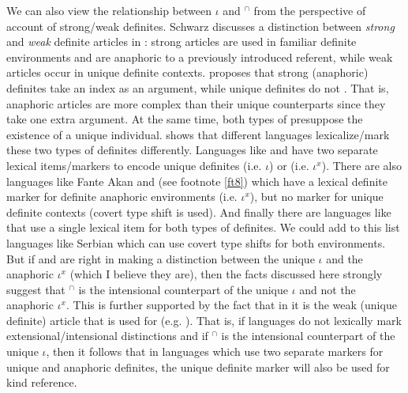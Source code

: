 \documentclass[output=paper,
modfonts
]{langscibook}
\begin{document}
	
	We can also view the relationship between $\iota$ and $^\cap$ from the perspective of  account of strong/weak definites. Schwarz discusses a distinction between \textit{strong} and \textit{weak} definite articles in : strong articles are used in familiar definite environments and are anaphoric to a previously introduced referent, while weak articles occur in unique definite contexts. \citeauthor{Schwarz2009} proposes that strong (anaphoric) definites take an index as an argument, while unique definites do not \citep[see also][]{Jenkstoappear}. That is, anaphoric articles are more complex than their unique counterparts since they take one extra argument. At the same time, both types of  presuppose the existence of a unique individual. \citet{Jenkstoappear} shows that different languages lexicalize/mark these two types of definites differently. Languages like  and  \citep[see][]{Schwarz2013} have two separate lexical items/markers to encode unique definites (i.e. $\iota$) or  (i.e. $\iota^x$). There are also languages like Fante Akan and  (see footnote \ref{ft8}) which have a lexical definite marker for definite anaphoric environments (i.e. $\iota^x$), but no marker for unique definite contexts (covert type shift is used). And finally there are languages like  that use a single lexical item for both types of definites. We could add to this list languages like Serbian which can use covert type shifts for both environments. But if \citeauthor{Schwarz2009} and \citeauthor{Jenkstoappear} are right in making a distinction between the unique $\iota$ and the anaphoric $\iota^x$ (which I believe they are), then the facts discussed here strongly suggest that $^\cap$ is the intensional counterpart of the unique $\iota$ and not the anaphoric $\iota^x$. This is further supported by the fact that in  it is the weak (unique definite) article that is used for  (e.g. \citealt[65-66]{Schwarz2009}). That is, if languages do not lexically mark extensional/intensional distinctions and if $^\cap$ is the intensional counterpart of the unique $\iota$, then it follows that in languages which use two separate markers for unique and anaphoric definites, the unique definite marker will also be used for kind reference. 
	
\end{document}
